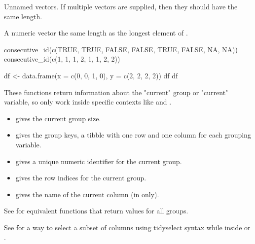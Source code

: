 \documentclass[a4paper]{book}
\begin{document}
%
\begin{Arguments}
\begin{ldescription}
\item[\code{...}] Unnamed vectors. If multiple vectors are supplied, then they should
have the same length.
\end{ldescription}
\end{Arguments}
%
\begin{Value}
A numeric vector the same length as the longest
element of .
\end{Value}
%
\begin{Examples}
\begin{ExampleCode}
consecutive_id(c(TRUE, TRUE, FALSE, FALSE, TRUE, FALSE, NA, NA))
consecutive_id(c(1, 1, 1, 2, 1, 1, 2, 2))

df <- data.frame(x = c(0, 0, 1, 0), y = c(2, 2, 2, 2))
df %
df %
\end{ExampleCode}
\end{Examples}
%
\begin{Description}
These functions return information about the "current" group or "current"
variable, so only work inside specific contexts like  and
.
\begin{itemize}

\item{}  gives the current group size.
\item{}  gives the group keys, a tibble with one row and one column
for each grouping variable.
\item{}  gives a unique numeric identifier for the current group.
\item{}  gives the row indices for the current group.
\item{}  gives the name of the current column (in  only).

\end{itemize}


See  for equivalent functions that return values for all
groups.

See  for a way to select a subset of columns using tidyselect syntax
while inside  or .
\end{Description}
\end{document}
